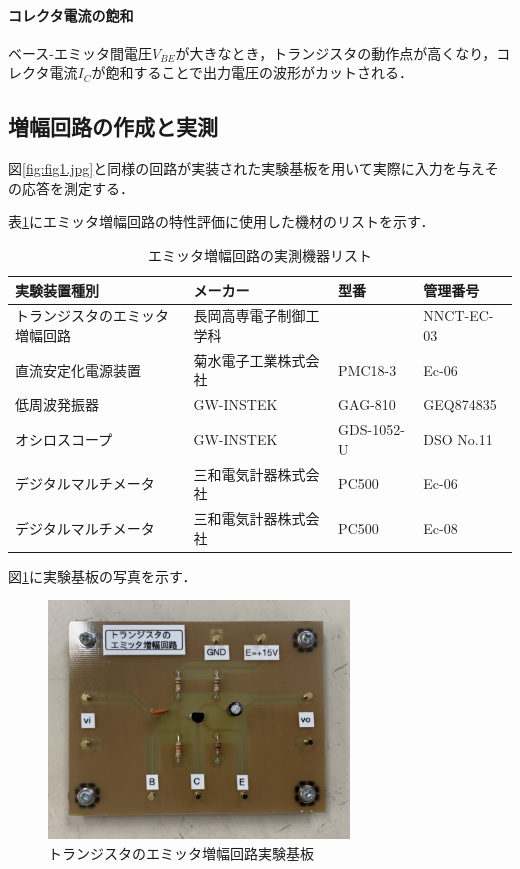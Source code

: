 \documentclass[dvipdfmx,titlepage,a4j]{jsarticle}  %
\numberwithin{equation}{section}
\begin{document}
\paragraph{コレクタ電流の飽和}
ベース-エミッタ間電圧$V_{BE}$が大きなとき，トランジスタの動作点が高くなり，コレクタ電流$I_C$が飽和することで出力電圧の波形がカットされる．

\subsection{増幅回路の作成と実測}
図\ref{fig:fig1.jpg}と同様の回路が実装された実験基板を用いて実際に入力を与えその応答を測定する．

表\ref{tbl:tr-list}にエミッタ増幅回路の特性評価に使用した機材のリストを示す．

\begin{table}[H]
  \caption{エミッタ増幅回路の実測機器リスト}
  \centering
  \begin{tabular}{l|l|l|l}
    \hline
    実験装置種別                   & メーカー               & 型番       & 管理番号   \\ \hline\hline
    トランジスタのエミッタ増幅回路 & 長岡高専電子制御工学科 &            & NNCT-EC-03 \\ \hline
    直流安定化電源装置             & 菊水電子工業株式会社   & PMC18-3    & Ec-06      \\ \hline
    低周波発振器                   & GW-INSTEK              & GAG-810    & GEQ874835  \\ \hline
    オシロスコープ                 & GW-INSTEK              & GDS-1052-U & DSO No.11  \\ \hline
    デジタルマルチメータ           & 三和電気計器株式会社   & PC500      & Ec-06      \\ \hline
    デジタルマルチメータ           & 三和電気計器株式会社   & PC500      & Ec-08      \\ \hline
  \end{tabular}
  \label{tbl:tr-list}
\end{table}


図\ref{fig:kiban.jpg}に実験基板の写真を示す．
\begin{figure}[H]
  \centering
  \includegraphics[width=8cm]{../photo/kiban.jpg}
  \caption{トランジスタのエミッタ増幅回路実験基板}
  \label{fig:kiban.jpg}
\end{figure}
\end{document}
